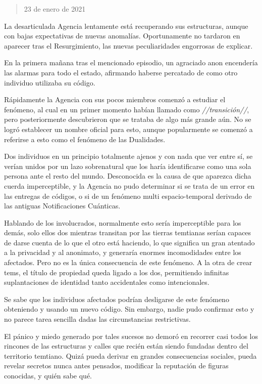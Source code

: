 \documentclass[
  spanish,
]{book}
\begin{document}
\begin{quote}
23 de enero de 2021
\end{quote}

La desarticulada Agencia lentamente está recuperando sus estructuras, aunque con bajas expectativas de nuevas anomalías. Oportunamente no tardaron en aparecer tras el Resurgimiento, las nuevas peculiaridades engorrosas de explicar.

En la primera mañana tras el mencionado episodio, un agraciado anon encendería las alarmas para todo el estado, afirmando haberse percatado de como otro individuo utilizaba su código.

Rápidamente la Agencia con sus pocos miembros comenzó a estudiar el fenómeno, al cual en un primer momento habían llamado como \emph{//transición//}, pero posteriormente descubrieron que se trataba de algo más grande aún. No se logró establecer un nombre oficial para esto, aunque popularmente se comenzó a referirse a esto como el fenómeno de las Dualidades.

Dos individuos en un principio totalmente ajenos y con nada que ver entre sí, se verían unidos por un lazo sobrenatural que los haría identificarse como una sola persona ante el resto del mundo. Desconocida es la causa de que aparezca dicha cuerda imperceptible, y la Agencia no pudo determinar si se trata de un error en las entregas de códigos, o si de un fenómeno multi espacio-temporal derivado de las antiguas Notificaciones Cuánticas.

Hablando de los involucrados, normalmente esto sería imperceptible para los demás, solo ellos dos mientras transitan por las tierras temtianas serían capaces de darse cuenta de lo que el otro está haciendo, lo que significa un gran atentado a la privacidad y al anonimato, y generaría enormes incomodidades entre los afectados. Pero no es la única consecuencia de este fenómeno. A la otra de crear tems, el título de propiedad queda ligado a los dos, permitiendo infinitas suplantaciones de identidad tanto accidentales como intencionales.

Se sabe que los individuos afectados podrían desligarse de este fenómeno obteniendo y usando un nuevo código. Sin embargo, nadie pudo confirmar esto y no parece tarea sencilla dadas las circunstancias restrictivas.

El pánico y miedo generado por tales sucesos no demoró en recorrer casi todos los rincones de las estructuras y calles que recién están siendo fundadas dentro del territorio temtiano. Quizá pueda derivar en grandes consecuencias sociales, pueda revelar secretos nunca antes pensados, modificar la reputación de figuras conocidas, y quién sabe qué.
\end{document}
